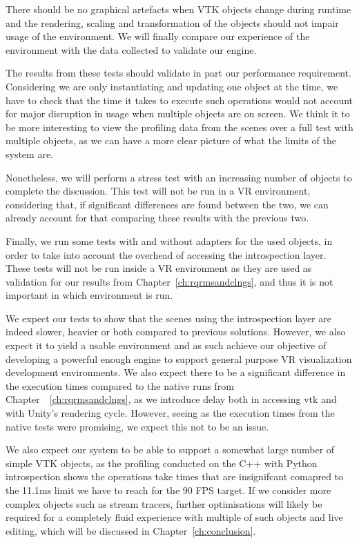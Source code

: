 There should be no graphical artefacts when VTK objects change during runtime and the rendering, scaling and transformation of the objects should not impair usage of the environment. We will finally compare our experience of the environment with the data collected to validate our engine.

The results from these tests should validate in part our performance requirement. Considering we are only instantiating and updating one object at the time, we have to check that the time it takes to execute such operations would not account for major disruption in usage when multiple objects are on screen. We think it to be more interesting to view the profiling data from the scenes over a full test with multiple objects, as we can have a more clear picture of what the limits of the system are.

Nonetheless, we will perform a stress test with an increasing number of objects to complete the discussion. This test will not be run in a VR environment, considering that, if significant differences are found between the two, we can already account for that comparing these results with the previous two.

Finally, we run some tests with and without adapters for the used objects, in order to take into account the overhead of accessing the introspection layer. These tests will not be run inside a VR environment as they are used as validation for our results from Chapter~\ref{ch:rqrmsandclngs}, and thus it is not important in which environment is run.

We expect our tests to show that the scenes using the introspection layer are indeed slower, heavier or both compared to previous solutions. However, we also expect it to yield a usable environment and as such achieve our objective of developing a powerful enough engine to support general purpose VR visualization development environments. We also expect there to be a significant difference in the execution times compared to the native runs from Chapter~~\ref{ch:rqrmsandclngs}, as we introduce delay both in accessing \acrshort{vtk} and with Unity's rendering cycle. However, seeing as the execution times from the native tests were promising, we expect this not to be an issue.

We also expect our system to be able to support a somewhat large number of simple VTK objects, as the profiling conducted on the C++ with Python introspection shows the operations take times that are insignifcant comapred to the 11.1ms limit we have to reach for the 90 FPS target. If we consider more complex objects such as stream tracers, further optimisations will likely be required for a completely fluid experience with multiple of such objects and live editing, which will be discussed in Chapter~\ref{ch:conclusion}.

